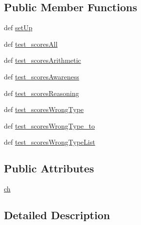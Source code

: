 \subsection*{Public Member Functions}
\begin{DoxyCompactItemize}
\item 
def \hyperlink{classcognitive__test__user__scores__tests_1_1CognitiveTestScoresTests_ada037fc15cd44a565c477079e86359e3}{set\-Up}
\item 
def \hyperlink{classcognitive__test__user__scores__tests_1_1CognitiveTestScoresTests_a4e6a9dd5c72853fec89ee5797f8141bf}{test\-\_\-scores\-All}
\item 
def \hyperlink{classcognitive__test__user__scores__tests_1_1CognitiveTestScoresTests_a7a3aa4b1173b3a1a78bb5d2fb16fdca7}{test\-\_\-scores\-Arithmetic}
\item 
def \hyperlink{classcognitive__test__user__scores__tests_1_1CognitiveTestScoresTests_a99d5750ea79be80987f037e8c2acba21}{test\-\_\-scores\-Awareness}
\item 
def \hyperlink{classcognitive__test__user__scores__tests_1_1CognitiveTestScoresTests_a88777286afc11ee62cfcd81342f2884d}{test\-\_\-scores\-Reasoning}
\item 
def \hyperlink{classcognitive__test__user__scores__tests_1_1CognitiveTestScoresTests_a56abede14a57b53c2bbb7cdc69596733}{test\-\_\-scores\-Wrong\-Type}
\item 
def \hyperlink{classcognitive__test__user__scores__tests_1_1CognitiveTestScoresTests_a0be7cbe57e037a163e83d57c8d14cb63}{test\-\_\-scores\-Wrong\-Type\-\_\-to}
\item 
def \hyperlink{classcognitive__test__user__scores__tests_1_1CognitiveTestScoresTests_a2cb522e28e7b3c3cf1b20e491a9e5fb2}{test\-\_\-scores\-Wrong\-Type\-List}
\end{DoxyCompactItemize}
\subsection*{Public Attributes}
\begin{DoxyCompactItemize}
\item 
\hyperlink{classcognitive__test__user__scores__tests_1_1CognitiveTestScoresTests_acd1f15d76fb3ef4f485144013e8269da}{ch}
\end{DoxyCompactItemize}


\subsection{Detailed Description}


